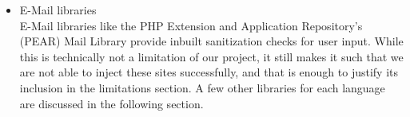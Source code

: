 \begin{itemize}
		\item E-Mail libraries\\
        E-Mail libraries like the PHP Extension and Application Repository's (PEAR) Mail Library provide inbuilt sanitization checks for user input. While this is technically not a limitation of our project, it still makes it such that we are not able to inject these sites successfully, and that is enough to justify its inclusion in the limitations section.
        A few other libraries for each language are discussed in the following section.
	\end{itemize}